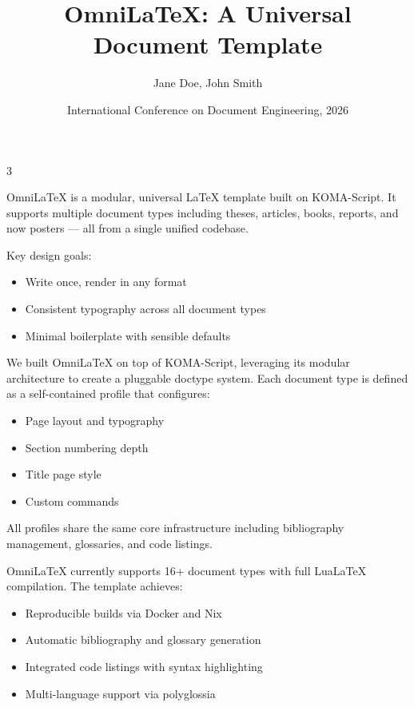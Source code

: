 \documentclass[
    language=english,
    doctype=poster,
    institution=none,
]{../../omnilatex}
\title{OmniLaTeX: A Universal Document Template}
\author{Jane Doe, John Smith}
\date{International Conference on Document Engineering, 2026}
\begin{document}
\maketitle

\begin{multicols}{3}

	\begin{posterblock}[Introduction]
		OmniLaTeX is a modular, universal \LaTeX{} template built on KOMA-Script.
		It supports multiple document types including theses, articles, books,
		reports, and now posters --- all from a single unified codebase.

		Key design goals:
		\begin{itemize}
			\item Write once, render in any format
			\item Consistent typography across all document types
			\item Minimal boilerplate with sensible defaults
		\end{itemize}
	\end{posterblock}

	\begin{posterblock}[Methods]
		We built OmniLaTeX on top of KOMA-Script, leveraging its modular
		architecture to create a pluggable doctype system. Each document type
		is defined as a self-contained profile that configures:
		\begin{itemize}
			\item Page layout and typography
			\item Section numbering depth
			\item Title page style
			\item Custom commands
		\end{itemize}

		All profiles share the same core infrastructure including bibliography
		management, glossaries, and code listings.
	\end{posterblock}

	\begin{posterblock}[Results]
		OmniLaTeX currently supports 16+ document types with full LuaLaTeX
		compilation. The template achieves:

		\begin{itemize}
			\item Reproducible builds via Docker and Nix
			\item Automatic bibliography and glossary generation
			\item Integrated code listings with syntax highlighting
			\item Multi-language support via polyglossia
		\end{itemize}


\end{posterblock}
\end{multicols}
\end{document}
